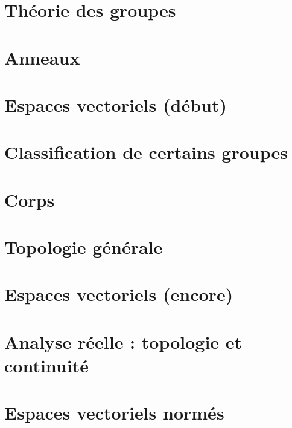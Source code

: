 \documentclass[a4paper,twoside,11pt]{book}
\begin{document}
\chapter{Théorie des groupes}



\chapter{Anneaux}



\chapter{Espaces vectoriels (début)}




\chapter{Classification de certains groupes}


\chapter{Corps}




\chapter{Topologie générale}







\chapter{Espaces vectoriels (encore)}









\chapter{Analyse réelle : topologie et continuité}





\chapter{Espaces vectoriels normés}




\end{document}
